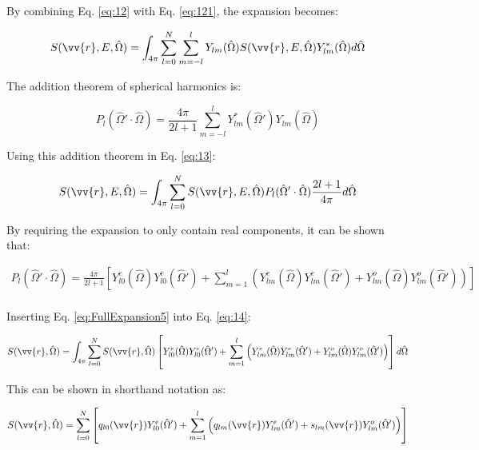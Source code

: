 \documentclass[10pt]{article}
\begin{document}
By combining Eq. \eqref{eq:12} with Eq. \eqref{eq:121}, the expansion becomes:

\begin{equation}
\label{eq:13}
S(\vv{r},E,\hat{\Omega})=\int_{4\pi}^{}\sum_{l=0}^{N}\sum_{m=-l}^{l}Y_{lm}(\hat{\Omega})S(\vv{r},E,\hat{\Omega})Y_{lm}^{*}(\hat{\Omega})d\hat{\Omega}
\end{equation}

The addition theorem of spherical harmonics is:

\begin{equation}
\label{eq:SHAdditionTheorem}
P_l(\hat{\Omega}'\cdot\hat{\Omega}) = \frac{4\pi}{2l+1} \sum_{m=-l}^{l} Y_{lm}^{*} (\hat{\Omega}') Y_{lm}(\hat{\Omega})
\end{equation}

Using this addition theorem in Eq. \eqref{eq:13}:

\begin{equation}
\label{eq:14}
S(\vv{r},E,\hat{\Omega})=\int_{4\pi}^{}\sum_{l=0}^{N}S(\vv{r},E,\hat{\Omega})P_l(\hat{\Omega}'\cdot\hat{\Omega})\frac{2l+1}{4\pi}d\hat{\Omega}
\end{equation}

By requiring the expansion to only contain real components, it can be shown that:

\begin{equation}
\begin{aligned}
\label{eq:FullExpansion5}
P_l(\hat{\Omega}'\cdot\hat{\Omega})=\frac{4\pi}{2l+1}\left\lbrack Y_{l0}^e(\hat{\Omega})Y_{l0}^e(\hat{\Omega}')+\sum_{m=1}^{l}\left(Y_{lm}^e(\hat{\Omega})Y_{lm}^{e}(\hat{\Omega}')+Y_{lm}^o(\hat{\Omega})Y_{lm}^{o}(\hat{\Omega}')\right)\right\rbrack\\
\end{aligned}
\end{equation}

Inserting Eq. \eqref{eq:FullExpansion5} into Eq. \eqref{eq:14}:

\begin{equation}
\label{eq:14}
S(\vv{r},\hat{\Omega})=\int_{4\pi}^{}\sum_{l=0}^{N}S(\vv{r},\hat{\Omega})\left\lbrack Y_{l0}^e(\hat{\Omega})Y_{l0}^e(\hat{\Omega}')+\sum_{m=1}^{l}\left(Y_{lm}^e(\hat{\Omega})Y_{lm}^{e}(\hat{\Omega}')+Y_{lm}^o(\hat{\Omega})Y_{lm}^{o}(\hat{\Omega}')\right)\right\rbrack d\hat{\Omega}
\end{equation}

This can be shown in shorthand notation as:

\begin{equation}
\label{eq:14}
S(\vv{r},\hat{\Omega})=\sum_{l=0}^{N}\left\lbrack q_{l0}(\vv{r})Y_{l0}^e(\hat{\Omega}')+\sum_{m=1}^{l}\left(q_{lm}(\vv{r})Y_{lm}^{e}(\hat{\Omega}')+s_{lm}(\vv{r})Y_{lm}^{o}(\hat{\Omega}')\right)\right\rbrack
\end{equation}
\end{document}
